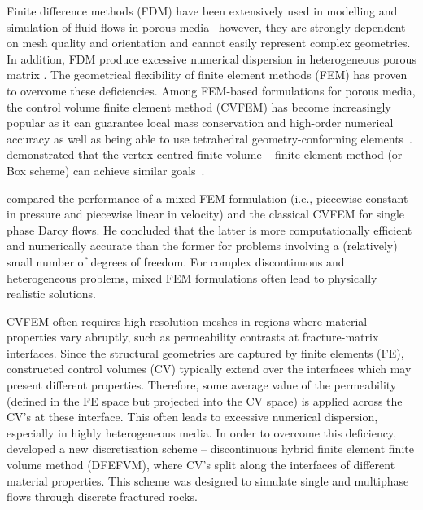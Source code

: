 \documentclass[preprint,authoryear,12pt]{elsarticle}
\begin{document}
Finite difference methods (FDM) have been extensively used in modelling and simulation of fluid flows in porous media~\citep{aziz_1986, chen_1997, chen_2005} however, they are strongly dependent on mesh quality and orientation and cannot easily represent complex geometries. In addition, FDM produce excessive numerical dispersion in heterogeneous porous matrix \citep{chavent_1986}. The geometrical flexibility of finite element methods (FEM) has proven to overcome these deficiencies. Among FEM-based formulations for porous media, the control volume finite element method (CVFEM) has become increasingly popular as it can guarantee local mass conservation and high-order numerical accuracy as well as being able to use tetrahedral geometry-conforming elements~\citep{forsyth_1990, cordazzo_2004, geiger_2004, hurtado_2007}.  \citet{huber_2000} demonstrated that the vertex-centred finite volume -- finite element method (or Box scheme) can achieve similar goals~\citep[see also][]{helmig_1997}.

\citet{durlofsky_1993,durlofsky_1994} compared the performance of a mixed FEM formulation (i.e., piecewise constant in pressure and piecewise linear in velocity) and the classical CVFEM for single phase Darcy flows. He concluded that the latter is more computationally efficient and numerically accurate than the former for problems involving a (relatively) small number of degrees of freedom. For complex discontinuous and heterogeneous problems, mixed FEM formulations often lead to physically realistic solutions.

\medskip

CVFEM often requires high resolution meshes in regions where material properties vary abruptly, such as permeability contrasts at fracture-matrix interfaces. Since the structural geometries are captured by finite elements (FE), constructed control volumes (CV) typically extend over the interfaces which may present different properties. Therefore, some average value of the permeability (defined in the FE space but projected into the CV space) is applied across the CV's at these interface. This often leads to excessive numerical dispersion, especially in highly heterogeneous media. In order to overcome this deficiency, \citet{nick_2011b, nick_2011a} developed a new discretisation scheme -- discontinuous hybrid finite element finite volume method (DFEFVM), where CV's split along the interfaces of different material properties. This scheme was designed to simulate single and multiphase flows through discrete fractured rocks. 
\end{document}

